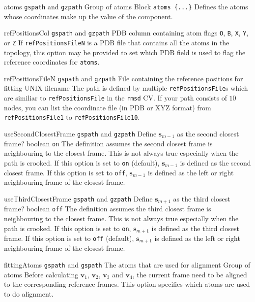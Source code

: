 \begin{cvcoptions}
\item %
  \key
    {atoms}{%
    \texttt{gspath} and \texttt{gzpath}}{%
    Group of atoms}{%
    Block \texttt{atoms \{...\}}}{%
    Defines the atoms whose coordinates make up the value of the component.}

\item %
  \key
    {refPositionsCol}{%
    \texttt{gspath} and \texttt{gzpath}}{%
    PDB column containing atom flags}{%
    \texttt{O}, \texttt{B}, \texttt{X}, \texttt{Y}, or \texttt{Z}}{%
    If \texttt{refPositionsFileN} is a PDB file that contains all the atoms in the topology, this option may be provided to set which PDB field is used to flag the reference coordinates for \texttt{atoms}.}

\item %
  \key
    {refPositionsFileN}{%
    \texttt{gspath} and \texttt{gzpath}}{%
    File containing the reference positions for fitting}{%
    UNIX filename}{%
		The path is defined by multiple \texttt{refPositionsFile}s which are similiar to \texttt{refPositionsFile} in the \texttt{rmsd} CV. If your path consists of $10$ nodes, you can list the coordinate file (in PDB or XYZ format) from \texttt{refPositionsFile1} to \texttt{refPositionsFile10}.
    }

\item %
  \keydef
    {useSecondClosestFrame}{%
    \texttt{gspath} and \texttt{gzpath}}{%
    Define $\mathbf{s}_{m-1}$ as the second closest frame?}{%
    boolean}{%
    \texttt{on}}{%
    The definition assumes the second closest frame is neighbouring to the closest frame. This is not always true especially when the path is crooked. If this option is set to \texttt{on} (default), $\mathbf{s}_{m-1}$ is defined as the second closest frame. If this option is set to \texttt{off}, $\mathbf{s}_{m-1}$ is defined as the left or right neighbouring frame of the closest frame.
  }

\item %
  \keydef
    {useThirdClosestFrame}{%
    \texttt{gspath} and \texttt{gzpath}}{%
    Define $\mathbf{s}_{m+1}$ as the third closest frame?}{%
    boolean}{%
    \texttt{off}}{%
    The definition assumes the third closest frame is neighbouring to the closest frame. This is not always true especially when the path is crooked. If this option is set to \texttt{on}, $\mathbf{s}_{m+1}$ is defined as the third closest frame. If this option is set to \texttt{off} (default), $\mathbf{s}_{m+1}$ is defined as the left or right neighbouring frame of the closest frame.
  }

\item %
  \key
    {fittingAtoms}{%
    \texttt{gspath} and \texttt{gspath}}{%
    The atoms that are used for alignment}{%
    Group of atoms}{%
		Before calculating $\mathbf{v}_1$, $\mathbf{v}_2$, $\mathbf{v}_3$ and $\mathbf{v}_4$, the current frame need to be aligned to the corresponding reference frames. This option specifies which atoms are used to do alignment.
    }

\end{cvcoptions}

